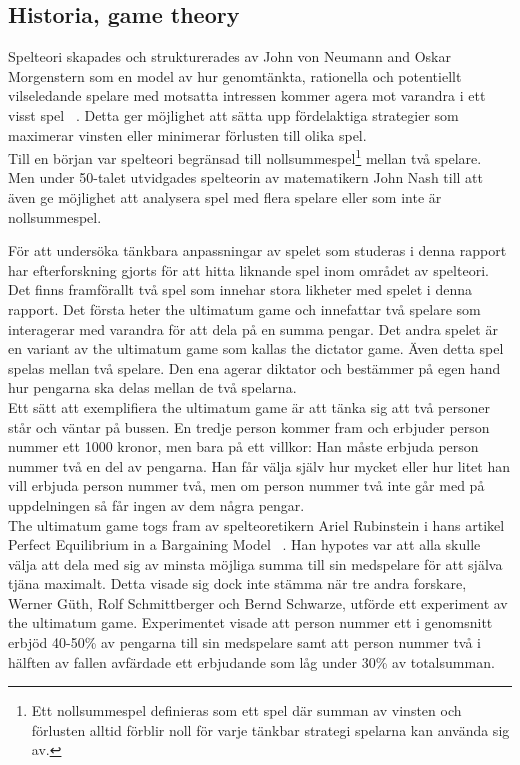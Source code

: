 \subsection{Historia, game theory}
Spelteori skapades och strukturerades av John von Neumann and Oskar Morgenstern som en model av hur genomtänkta, rationella och potentiellt vilseledande spelare med motsatta intressen kommer agera mot varandra i ett visst spel ~\cite{Flake:2001}. Detta ger möjlighet att sätta upp fördelaktiga strategier som maximerar vinsten eller minimerar förlusten till olika spel.\\

\noindent Till en början var spelteori begränsad till nollsummespel\footnote{Ett nollsummespel definieras som ett spel där summan av vinsten och förlusten alltid förblir noll för varje tänkbar strategi spelarna kan använda sig av.} mellan två spelare. Men under 50-talet utvidgades spelteorin av matematikern John Nash till att även ge möjlighet att analysera spel med flera spelare eller som inte är nollsummespel. 

\noindent För att undersöka tänkbara anpassningar av spelet som studeras i denna rapport har efterforskning gjorts för att hitta liknande spel inom området av spelteori. Det finns framförallt två spel som innehar stora likheter med spelet i denna rapport. Det första heter the ultimatum game och innefattar två spelare som interagerar med varandra för att dela på en summa pengar. Det andra spelet är en variant av the ultimatum game som kallas the dictator game. Även detta spel spelas mellan två spelare. Den ena agerar diktator och bestämmer på egen hand hur pengarna ska delas mellan de två spelarna.\\

\noindent Ett sätt att exemplifiera the ultimatum game är att tänka sig att två personer står och väntar på bussen. En tredje person kommer fram och erbjuder person nummer ett 1000 kronor, men bara på ett villkor: Han måste erbjuda person nummer två en del av pengarna. Han får välja själv hur mycket eller hur litet han vill erbjuda person nummer två, men om person nummer två inte går med på uppdelningen så får ingen av dem några pengar.\\

\noindent The ultimatum game togs fram av spelteoretikern Ariel Rubinstein i hans artikel Perfect Equilibrium in a Bargaining Model ~\cite{Rubinstein:1982}. Han hypotes var att alla skulle välja att dela med sig av minsta möjliga summa till sin medspelare för att själva tjäna maximalt. Detta visade sig dock inte stämma när tre andra forskare, Werner Güth, Rolf Schmittberger och Bernd Schwarze, utförde ett experiment av the ultimatum game. Experimentet visade att person nummer ett i genomsnitt erbjöd 40-50\% av pengarna till sin medspelare samt att person nummer två i hälften av fallen avfärdade ett erbjudande som låg under 30\% av totalsumman.\\

